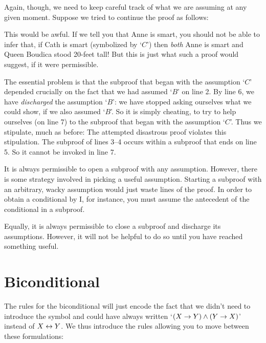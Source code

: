Again, though, we need to keep careful track of what we are assuming at any given moment. Suppose we tried to continue the proof as follows:
\begin{pf}
\open
	\open
	\close
\close
{}
\end{pf}
This would be awful. If we tell you that Anne is smart, you should not be able to infer that, if Cath is smart (symbolized by `$C$') then \emph{both} Anne is smart and Queen Boudica stood 20-feet tall! But this is just what such a proof would suggest, if it were permissible.

The essential problem is that the subproof that began with the assumption `$C$' depended crucially on the fact that we had assumed `$B$' on line 2. By line 6, we have \emph{discharged} the assumption `$B$': we have stopped asking ourselves what we could show, if we also assumed `$B$'. So it is simply cheating, to try to help ourselves (on line 7) to the subproof that began with the assumption `$C$'. Thus we stipulate, much as before:
The attempted disastrous proof violates this stipulation. The subproof of lines 3--4 occurs within a subproof that ends on line 5. So it cannot be invoked in line 7.

It is always permissible to open a subproof with any assumption. However, there is some strategy involved in picking a useful assumption. Starting a subproof with an arbitrary, wacky assumption would just waste lines of the proof. In order to obtain a conditional by {\eif}I, for instance, you must assume the antecedent of the conditional in a subproof. 

Equally, it is always permissible to close a subproof and discharge its assumptions. However, it will not be helpful to do so until you have reached something useful.


\section{Biconditional}
\nonexaminable

The rules for the biconditional will just encode the fact that we didn't need to introduce the symbol and could have always written `$(X\rightarrow Y)\wedge(Y\rightarrow X)$' instead of $X\leftrightarrow Y$. We thus introduce the rules allowing you to move between these formulations: 

